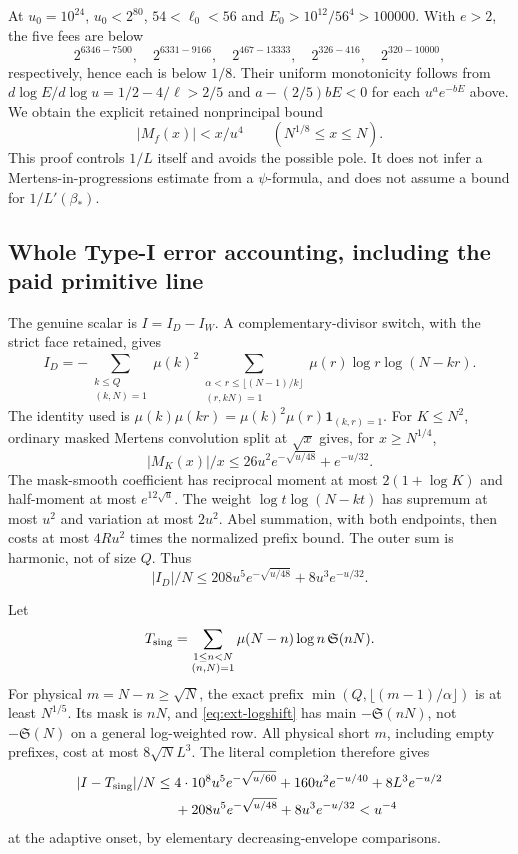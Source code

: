 \documentclass[11pt,a4paper]{article}
\theoremstyle{definition}
\theoremstyle{remark}
\begin{document}
At $u_0=10^{24}$, $u_0<2^{80}$, $54<\ell_0<56$ and
$E_0>10^{12}/56^4>100000$. With $e>2$, the five fees are below
\[
 2^{6346-7500},\quad2^{6331-9166},\quad
 2^{467-13333},\quad2^{326-416},\quad2^{320-10000},
\]
respectively, hence each is below $1/8$.
Their uniform monotonicity follows from
$d\log E/d\log u=1/2-4/\ell>2/5$ and
$a-(2/5)bE<0$ for each $u^ae^{-bE}$ above.
We obtain the explicit retained nonprincipal bound
\begin{equation}\label{eq:ext-mobiusprefix}
 |M_f(x)|<x/u^4\qquad(N^{1/8}\leq x\leq N).
\end{equation}
This proof controls $1/L$ itself and avoids the possible pole.
It does not infer a Mertens-in-progressions estimate from a
$\psi$-formula, and does not assume a bound for $1/L'(\beta_*)$.

\subsection{Whole Type-I error accounting, including the paid primitive line}

The genuine scalar is $I=I_D-I_W$. A complementary-divisor switch,
with the strict face retained, gives
\[
 I_D=-\sum_{\substack{k\leq Q\\(k,N)=1}}\mu(k)^2
 \sum_{\substack{\alpha<r\leq\lfloor(N-1)/k\rfloor\\(r,kN)=1}}
                  \mu(r)\log r\log(N-kr).
\]
The identity used is
$\mu(k)\mu(kr)=\mu(k)^2\mu(r)\mathbf1_{(k,r)=1}$.
For $K\leq N^2$, ordinary masked Mertens convolution split at
$\sqrt x$ gives, for $x\geq N^{1/4}$,
\[
 |M_K(x)|/x\leq26u^2e^{-\sqrt{u/48}}+e^{-u/32}.
\]
The mask-smooth coefficient has reciprocal moment at most
$2(1+\log K)$ and half-moment at most $e^{12\sqrt u}$.
The weight $\log t\log(N-kt)$ has supremum at most $u^2$ and
variation at most $2u^2$. Abel summation, with both endpoints,
then costs at most $4Ru^2$ times the normalized prefix bound.
The outer sum is harmonic, not of size $Q$. Thus
\[
 |I_D|/N\leq208u^5e^{-\sqrt{u/48}}+8u^3e^{-u/32}.
\]

Let
\[
 T_{\rm sing}=\sum_{\substack{1\leq n<N\\(n,N)=1}}
                   \mu(N-n)\log n\,\mathfrak S(nN).
\]
For physical $m=N-n\geq\sqrt N$, the exact prefix
$\min(Q,\lfloor(m-1)/\alpha\rfloor)$ is at least $N^{1/5}$.
Its mask is $nN$, and \eqref{eq:ext-logshift} has main
$-\mathfrak S(nN)$, not $-\mathfrak S(N)$ on a general log-weighted
row. All physical short $m$, including empty prefixes, cost at most
$8\sqrt N L^3$. The literal completion therefore gives
\begin{align*}
 |I-T_{\rm sing}|/N\leq{}&4\cdot10^8u^5e^{-\sqrt{u/60}}
        +160u^2e^{-u/40}+8L^3e^{-u/2}\\
        &+208u^5e^{-\sqrt{u/48}}+8u^3e^{-u/32}<u^{-4}
\end{align*}
at the adaptive onset, by elementary decreasing-envelope comparisons.
\end{document}
